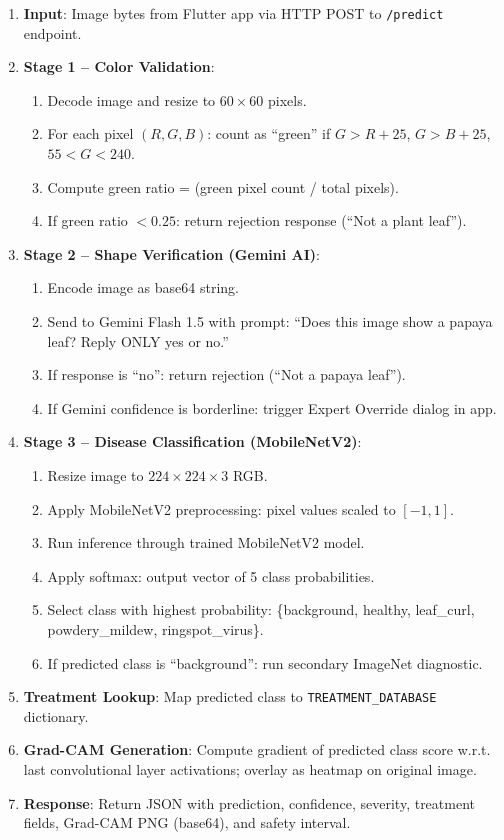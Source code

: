 \documentclass[12pt,a4paper]{report}
\begin{document}
\begin{enumerate}
    \item \textbf{Input}: Image bytes from Flutter app via HTTP POST to \texttt{/predict} endpoint.
    \item \textbf{Stage 1 -- Color Validation}:
    \begin{enumerate}
        \item Decode image and resize to $60 \times 60$ pixels.
        \item For each pixel $(R, G, B)$: count as ``green'' if $G > R+25$, $G > B+25$, $55 < G < 240$.
        \item Compute green ratio = (green pixel count / total pixels).
        \item If green ratio $< 0.25$: return rejection response (``Not a plant leaf'').
    \end{enumerate}
    \item \textbf{Stage 2 -- Shape Verification (Gemini AI)}:
    \begin{enumerate}
        \item Encode image as base64 string.
        \item Send to Gemini Flash 1.5 with prompt: ``Does this image show a papaya leaf? Reply ONLY yes or no.''
        \item If response is ``no'': return rejection (``Not a papaya leaf'').
        \item If Gemini confidence is borderline: trigger Expert Override dialog in app.
    \end{enumerate}
    \item \textbf{Stage 3 -- Disease Classification (MobileNetV2)}:
    \begin{enumerate}
        \item Resize image to $224 \times 224 \times 3$ RGB.
        \item Apply MobileNetV2 preprocessing: pixel values scaled to $[-1, 1]$.
        \item Run inference through trained MobileNetV2 model.
        \item Apply softmax: output vector of 5 class probabilities.
        \item Select class with highest probability: \{background, healthy, leaf\_curl, powdery\_mildew, ringspot\_virus\}.
        \item If predicted class is ``background'': run secondary ImageNet diagnostic.
    \end{enumerate}
    \item \textbf{Treatment Lookup}: Map predicted class to \texttt{TREATMENT\_DATABASE} dictionary.
    \item \textbf{Grad-CAM Generation}: Compute gradient of predicted class score w.r.t. last convolutional layer activations; overlay as heatmap on original image.
    \item \textbf{Response}: Return JSON with prediction, confidence, severity, treatment fields, Grad-CAM PNG (base64), and safety interval.
\end{enumerate}
\end{document}
